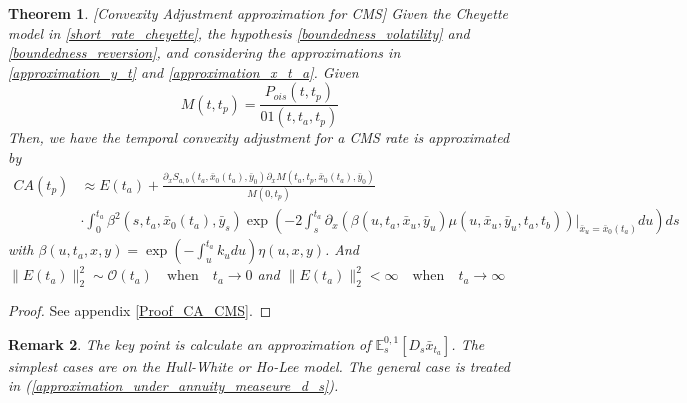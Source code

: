 \documentclass[a4paper,10pt]{article}
\newtheorem{theorem}{Theorem}[section]
\newtheorem{remark}[theorem]{Remark}
\newcommand{\1}{\mathbf{1}}
\begin{document}
\begin{theorem}\label{Th_CA_CMS}[Convexity Adjustment approximation for CMS]
Given the Cheyette model in \eqref{short_rate_cheyette}, the hypothesis \ref{boundedness_volatility} and \ref{boundedness_reversion}, and considering the approximations in \eqref{approximation_y_t} and \eqref{approximation_x_t_a}. Given
\begin{equation}
M(t,t_p)= \frac{P_{ois}(t,t_p)}{01(t,t_a,t_p)}
\end{equation}
Then, we have the temporal convexity adjustment for a CMS rate is approximated by
\begin{align} \label{cms_first_order_convexity}
CA(t_p) &\approx  E(t_a) + \frac{\partial_x S_{a,b}(t_a,\bar{x}_0(t_a), \bar{y}_0) \partial_x M(t_a,t_p,\bar{x}_0(t_a), \bar{y}_0)}{M(0,t_p)}  \\
&\cdot \int_{0}^{t_a}  \beta^2(s,t_a,\bar{x}_0(t_a),\bar{y}_s) \exp\left(-2\int_{s}^{t_a}\partial_x (\beta(u,t_a,\bar{x}_u,\bar{y}_u) \mu(u,\bar{x}_u, \bar{y}_u,t_a,t_b))|_{\bar{x}_u=\bar{x}_{0}(t_a)}  du \right)ds \nonumber 
\end{align}
with  $\beta(u,t_a,x,y) = \exp\left(-\int_{u}^{t_a}k_u du\right)\eta(u,x,y)$. And $\|E(t_a)\|^{2}_{2} \sim \mathcal{O}(t_a) \quad \text{when} \quad t_a \to 0$ and $\|E(t_a)\|^{2}_{2} < \infty \quad \text{when} \quad t_a \to \infty$
\end{theorem}
\begin{proof}
See appendix \ref{Proof_CA_CMS}.
\end{proof}

\begin{remark}
The key point is calculate an approximation of $\mathbb{E}_s^{0,1}\left[ D_s \bar{x}_{t_a}\right]$. The simplest cases are on the Hull-White or Ho-Lee model. The general case is treated in (\ref{approximation_under_annuity_measeure_d_s}). 
\end{remark}
\end{document}
